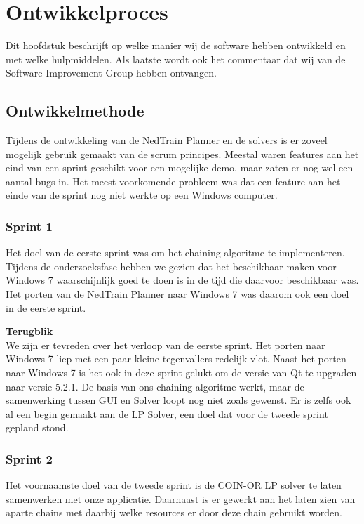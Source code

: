 \section{Ontwikkelproces}
Dit hoofdstuk beschrijft op welke manier wij de software hebben ontwikkeld en met welke hulpmiddelen. Als laatste wordt ook het commentaar dat wij van de Software Improvement Group hebben ontvangen. 

\subsection{Ontwikkelmethode}
Tijdens de ontwikkeling van de NedTrain Planner en de solvers is er zoveel mogelijk gebruik gemaakt van de scrum principes. Meestal waren features aan het eind van een sprint geschikt voor een mogelijke demo, maar zaten er nog wel een aantal bugs in. Het meest voorkomende probleem was dat een feature aan het einde van de sprint nog niet werkte op een Windows computer.

\subsubsection{Sprint 1}
Het doel van de eerste sprint was om het chaining algoritme te implementeren. Tijdens de onderzoeksfase hebben we gezien dat het beschikbaar maken voor Windows 7 waarschijnlijk goed te doen is in de tijd die daarvoor beschikbaar was. Het porten van de NedTrain Planner naar Windows 7 was daarom ook een doel in de eerste sprint. 

\textbf{Terugblik} \\
We zijn er tevreden over het verloop van de eerste sprint. Het porten naar Windows 7 liep met een paar kleine tegenvallers redelijk vlot. Naast het porten naar Windows 7 is het ook in deze sprint gelukt om de versie van Qt te upgraden naar versie 5.2.1. De basis van ons chaining algoritme werkt, maar de samenwerking tussen GUI en Solver loopt nog niet zoals gewenst. Er is zelfs ook al een begin gemaakt aan de LP Solver, een doel dat voor de tweede sprint gepland stond. 

\subsubsection{Sprint 2}
Het voornaamste doel van de tweede sprint is de COIN-OR LP solver te laten samenwerken met onze applicatie. Daarnaast is er gewerkt aan het laten zien van aparte chains met daarbij welke resources er door deze chain gebruikt worden. 

